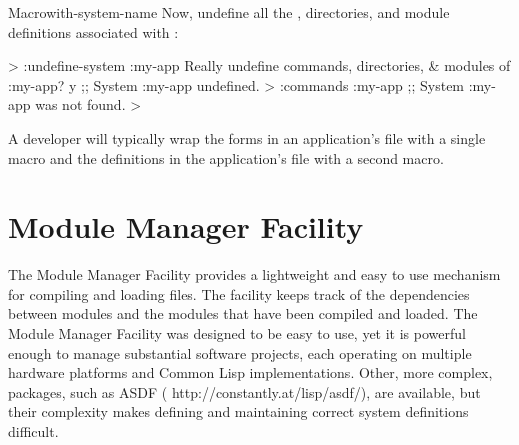 \documentclass[10pt,twoside,english,pdftex]{article}
\begin{document}
\begin{functiondoc}{Macro}{with-system-name}{%
    }
Now, undefine all the , directories, and module definitions
associated with  : 
%
\W\supp
\begin{example}
  > :undefine-system :my-app
  Really undefine commands, directories, & modules of :my-app?  y
  ;; System :my-app undefined.
  > :commands :my-app
  ;; System :my-app was not found.
  >
\end{example}

\fnnotes A developer will typically wrap the
 forms in an application's
 file with a single
 macro and the definitions in the
application's  file with a second
 macro.

\end{functiondoc}


\T\markright{}%
\T\pagestyle{plain}
\T\cleardoublepage
\W{}
\T\pagestyle{fancy}
\T\thispagestyle{fancybottom}
\T\global\def\fnlastname{ }%
\T\renewcommand{\headrulewidth}{0pt}
\section{Module Manager Facility}
\label{sec:module-manager}%

%
%
%
%
%
%
%
%
%
%
The Module Manager Facility provides a lightweight and easy to use mechanism
for compiling and loading  files.  The facility keeps track of
the dependencies between modules and the modules that have been compiled and
loaded. The Module Manager Facility was designed to be easy to use, yet it is
powerful enough to manage substantial software projects, each operating on
multiple hardware platforms and Common Lisp implementations.  Other, more
complex,  packages, such as ASDF
(%
{http://constantly.at/lisp/asdf/}), are available, but their complexity makes
defining and maintaining correct system definitions difficult.
\end{document}
